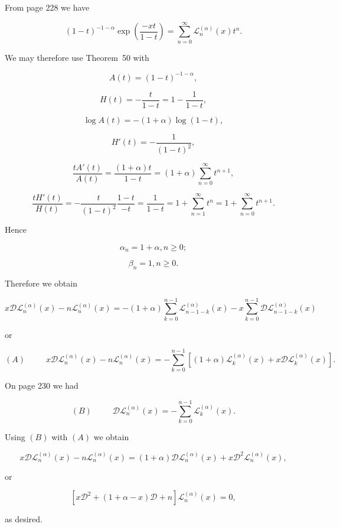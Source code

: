 \begin{solution}
From page 228 we have

$$(1-t)^{-1-\alpha} \exp \left( \dfrac{-xt}{1-t} \right) = \displaystyle\sum_{n=0}^{\infty} \mathscr{L}_n^{(\alpha)}(x)t^n.$$

We may therefore use Theorem~50 with

$$A(t) = (1-t)^{-1-\alpha},$$

$$H(t) = -\dfrac{t}{1-t} = 1 - \dfrac{1}{1-t},$$

$$\log A(t) = -(1+  \alpha) \log(1-t),$$

$$H'(t) = - \dfrac{1}{(1-t)^2},$$

$$\dfrac{tA'(t)}{A(t)} = \dfrac{(1+\alpha)t}{1-t} = (1 + \alpha) \displaystyle\sum_{n=0}^{\infty} t^{n+1},$$

$$\dfrac{tH'(t)}{H(t)} = -\dfrac{t}{(1-t)^2} \dfrac{1-t}{-t} = \dfrac{1}{1-t} = 1 + \displaystyle\sum_{n=1}^{\infty} t^n = 1+ \displaystyle\sum_{n=0}^{\infty} t^{n+1}.$$

Hence

$$\alpha_n=1+\alpha, n \geq 0;$$

$$\beta_n=1, n \geq 0.$$

Therefore we obtain

$$x \mathscr{D} \mathscr{L}_n^{(\alpha)}(x) - n \mathscr{L}_n^{(\alpha)}(x) = -(1+\alpha) \displaystyle\sum_{k=0}^{n-1} \mathscr{L}_{n-1-k}^{(\alpha)}(x) - x \displaystyle\sum_{k=0}^{n-1} \mathscr{D} \mathscr{L}_{n-1-k}^{(\alpha)}(x)$$

or

$$(A) \hspace{30pt} x \mathscr{D} \mathscr{L}_n^{(\alpha)}(x) - n \mathscr{L}_n^{(\alpha)}(x) = - \displaystyle\sum_{k=0}^{n-1} [ (1 + \alpha)\mathscr{L}_k^{(\alpha)}(x) + x \mathscr{D} \mathscr{L}_k^{(\alpha)}(x)].$$

On page 230 we had

$$(B) \hspace{30pt} \mathscr{D} \mathscr{L}_n^{(\alpha)}(x) = - \displaystyle\sum_{k=0}^{n-1} \mathscr{L}_k^{(\alpha)}(x).$$

Using $(B)$ with $(A)$ we obtain

$$x \mathscr{D} \mathscr{L}_n^{(\alpha)}(x) - n \mathscr{L}_n^{(\alpha)}(x) = (1 + \alpha) \mathscr{D} \mathscr{L}_n^{(\alpha)}(x) + x \mathscr{D}^2 \mathscr{L}_n^{(\alpha)}(x),$$

or

$$[x \mathscr{D}^2 + (1 + \alpha - x) \mathscr{D} + n] \mathscr{L}_n^{(\alpha)}(x) = 0,$$

as desired.
\end{solution}

